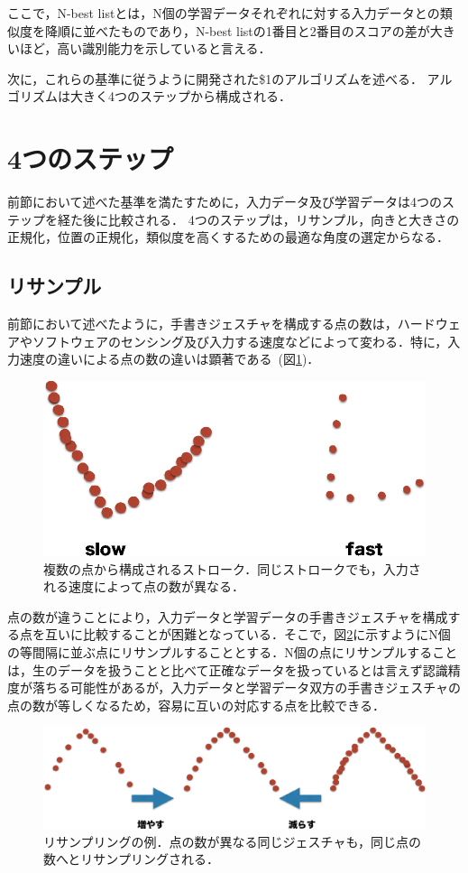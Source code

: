 ここで，N-best listとは，N個の学習データそれぞれに対する入力データとの類似度を降順に並べたものであり，N-best listの1番目と2番目のスコアの差が大きいほど，高い識別能力を示していると言える．

次に，これらの基準に従うように開発された\$1のアルゴリズムを述べる．
アルゴリズムは大きく4つのステップから構成される．


\section{4つのステップ}
前節において述べた基準を満たすために，入力データ及び学習データは4つのステップを経た後に比較される．
4つのステップは，リサンプル，向きと大きさの正規化，位置の正規化，類似度を高くするための最適な角度の選定からなる．

\subsection{リサンプル}
前節において述べたように，手書きジェスチャを構成する点の数は，ハードウェアやソフトウェアのセンシング及び入力する速度などによって変わる．特に，入力速度の違いによる点の数の違いは顕著である~(図\ref{fig:strokes})．

\begin{figure} [!h]
\centering
\includegraphics [width=0.8\columnwidth]{img/strokes.eps}
\caption{複数の点から構成されるストローク．同じストロークでも，入力される速度によって点の数が異なる．}
\label{fig:strokes}
\end{figure}

点の数が違うことにより，入力データと学習データの手書きジェスチャを構成する点を互いに比較することが困難となっている．そこで，図\ref{fig:resample}に示すようにN個の等間隔に並ぶ点にリサンプルすることとする．N個の点にリサンプルすることは，生のデータを扱うことと比べて正確なデータを扱っているとは言えず認識精度が落ちる可能性があるが，入力データと学習データ双方の手書きジェスチャの点の数が等しくなるため，容易に互いの対応する点を比較できる．

\begin{figure} [!h]
\centering
\includegraphics [width=0.8\columnwidth]{img/resample.eps}
\caption{リサンプリングの例．点の数が異なる同じジェスチャも，同じ点の数へとリサンプリングされる．}
\label{fig:resample}
\end{figure}

